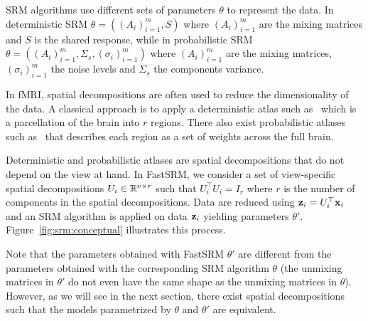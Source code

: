 \documentclass{article}
\begin{document}

SRM algorithms use different sets of parameters $\theta$ to represent the data.
%
In deterministic SRM $\theta = \left((A_i)_{i=1}^m, S \right)$ where $(A_i)_{i=1}^m$ are the
mixing matrices and $S$ is the shared response, while in probabilistic SRM $\theta
= \left( (A_i)_{i=1}^m, \Sigma_s, (\sigma_i)_{i=1}^m \right) $ where $(A_i)_{i=1}^m$ are the
mixing matrices, $(\sigma_i)_{i=1}^m$ the noise levels and $\Sigma_s$ the
components variance.
%


In fMRI, spatial decompositions are often used to reduce the dimensionality of
the data.
%
A classical approach is to apply a deterministic atlas such
as~\cite{bellec2010multi} which is a parcellation of the
brain into $r$ regions.
%
There also exist probabilistic atlases
such as~\cite{dadi_fine-grain_2020} that describes each region as a set of weights across
the full brain. 
%

Deterministic and probabilistic atlases are spatial decompositions that do not
depend on the view at hand. In FastSRM, we consider a set of view-specific
spatial decompositions
$U_i \in \mathbb{R}^{v \times r}$ such that
$U_i^{\top}U_i = I_r$ where $r$ is the number of components in the spatial decompositions.
%
Data are reduced using $\mathbf{z}_i = U_i^{\top} \mathbf{x}_i$ and an SRM algorithm is applied
on data $\mathbf{z}_i$ yielding parameters $\theta'$.
%
Figure~\ref{fig:srm:conceptual} illustrates this process.
%


Note that the parameters obtained with FastSRM $\theta'$ are different
from the parameters obtained with the corresponding SRM algorithm $\theta$ (the
unmixing matrices in $\theta'$ do not even have the same shape as the unmixing
matrices in $\theta$).
%
However, as we will see in the next section, there exist spatial decompositions such that the
models parametrized by $\theta$ and
$\theta'$ are equivalent.
%
\end{document}
